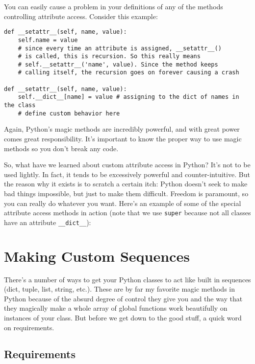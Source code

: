 \documentclass[a4paper,11pt]{article}
\newcommand{\code}[1]{\texttt{#1}}
\begin{document}
You can easily cause a problem in your definitions of any of the methods controlling attribute access. Consider this example:

\begin{lstlisting}
def __setattr__(self, name, value):
    self.name = value
    # since every time an attribute is assigned, __setattr__() 
    # is called, this is recursion. So this really means
    # self.__setattr__('name', value). Since the method keeps
    # calling itself, the recursion goes on forever causing a crash
  
def __setattr__(self, name, value):
    self.__dict__[name] = value # assigning to the dict of names in the class
    # define custom behavior here
\end{lstlisting}

Again, Python's magic methods are incredibly powerful, and with great power comes great responsibility. It's important to know the proper way to use magic methods so you don't break any code.        

So, what have we learned about custom attribute access in Python? It's not to be used lightly. In fact, it tends to be excessively powerful and counter-intuitive. But the reason why it exists is to scratch a certain itch: Python doesn't seek to make bad things impossible, but just to make them difficult. Freedom is paramount, so you can really do whatever you want. Here's an example of some of the special attribute access methods in action (note that we use \code{super} because not all classes have an attribute \code{__dict__}):



\section{Making Custom Sequences}

There's a number of ways to get your Python classes to act like built in sequences (dict, tuple, list, string, etc.). These are by far my favorite magic methods in Python because of the absurd degree of control they give you and the way that they magically make a whole array of global functions work beautifully on instances of your class. But before we get down to the good stuff, a quick word on requirements.

\subsection{Requirements}
\end{document}
